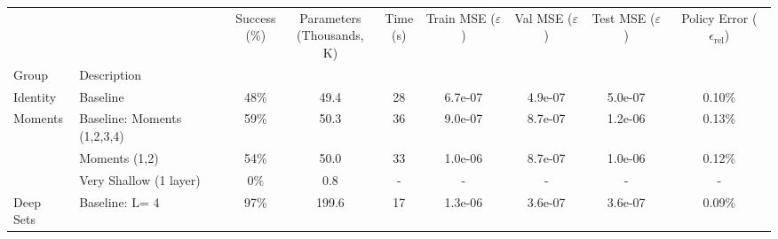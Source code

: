 \begin{tabular}{llccccccc}
\toprule
          &                                                                     & \shortstack{Success \\(\%)} & \shortstack{Parameters \\ (Thousands, K)} & \shortstack{Time \\ (s)} & \shortstack{Train MSE \\ ($\varepsilon$)} & \shortstack{Val MSE \\ ($\varepsilon$)} & \shortstack{Test MSE \\ ($\varepsilon$)} & \shortstack{Policy Error\\ ($\epsilon_{\mathrm{rel}}$)} \\
Group & Description &                             &                                           &                          &                                           &                                         &                                          &                                                         \\
\midrule
Identity & Baseline &                        48\% &                                      49.4 &                       28 &                                   6.7e-07 &                                 4.9e-07 &                                  5.0e-07 &                                             0.10\% \\
\multirow{3}{*}{Moments} & Baseline: Moments (1,2,3,4) &                        59\% &                                      50.3 &                       36 &                                   9.0e-07 &                                 8.7e-07 &                                  1.2e-06 &                                             0.13\% \\
          & Moments (1,2) &                        54\% &                                      50.0 &                       33 &                                   1.0e-06 &                                 8.7e-07 &                                  1.0e-06 &                                             0.12\% \\
          & Very Shallow (1 layer) &                         0\% &                                       0.8 &                        - &                                         - &                                       - &                                        - &                                                  - \\
\cline{1-9}
\multirow{5}{*}{Deep Sets} & Baseline: L= 4 &                        97\% &                                     199.6 &                       17 &                                   1.3e-06 &                                 3.6e-07 &                                  3.6e-07 &                                             0.09\% \\

\end{tabular}
